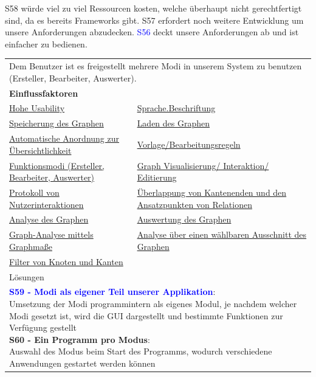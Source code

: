 \documentclass[enabledeprecatedfontcommands,fontsize=11pt,paper=a4,twoside]{scrartcl}
\newcounter{one}
\newcommand{\cb}[1]{{\textcolor{blue}{#1}}}
\begin{document}
	\begin{onehalfspace}
		S58 würde viel zu viel Ressourcen kosten, welche überhaupt nicht gerechtfertigt sind, da es bereits Frameworks gibt. S57 erfordert noch weitere Entwicklung um unsere Anforderungen abzudecken. \cb{S56} deckt unsere Anforderungen ab und ist einfacher zu bedienen.
	\end{onehalfspace}
	
	\newpage
	\begin{tabular} {|p{8cm} p{8cm}|}
		\hline
		\rowcolor{prob}\multicolumn{2}{|l|}{\parbox{16cm}{\textbf{23: Umsetzung der Funktionsmodi}}} \\  \hline\hline 
		\multicolumn{2}{|l|}{\parbox{16cm}{Dem Benutzer ist es freigestellt mehrere Modi in unserem System zu benutzen (Ersteller, Bearbeiter, Auswerter).}}\rule{0pt}{4ex}\\ [1ex] \hline
		\multicolumn{2}{|l|}{\textbf{Einflussfaktoren}}\\
		\hyperlink {g}{Hohe Usability}&
		\hyperlink {hh}{Sprache.Beschriftung} \\
		\hyperlink {v}{Speicherung des Graphen} &
		\hyperlink {w}{Laden des Graphen} \\
		\hyperlink {x}{Automatische Anordnung zur Übersichtlichkeit} &
		\hyperlink {y}{Vorlage/Bearbeitungsregeln} \\
		\hyperlink {z}{Funktionsmodi (Ersteller, Bearbeiter, Auswerter)} &
		\hyperlink {aa}{Graph Visualisierung/ Interaktion/ Editierung}\\
		\hyperlink {bb}{Protokoll von Nutzerinteraktionen} &
		\hyperlink {cc}{Überlappung von Kantenenden und den Ansatzpunkten von Relationen} \\
		\hyperlink {oo}{Analyse des Graphen} &
		\hyperlink {pp}{Auswertung des Graphen} \\
		\hyperlink {qq}{Graph-Analyse mittels Graphmaße} & 
		\hyperlink {rr}{Analyse über einen wählbaren Ausschnitt des Graphen} \\ 
		\hyperlink {ss}{Filter von Knoten und Kanten} &
		\\ \hline
		\multicolumn{2}{|l|}{Lösungen} \\
		\multicolumn{2}{|l|}{\parbox{16cm}{
				\textbf{\cb{\hypertarget{uuu}{S59 - Modi als eigener Teil unserer Applikation}}}: \\
				Umsetzung der Modi programmintern als eigenes Modul, je nachdem welcher Modi gesetzt ist, wird die GUI dargestellt und bestimmte Funktionen zur Verfügung gestellt \\
				\textbf{S60 - Ein Programm pro Modus}: \\
				Auswahl des Modus beim Start des Programms, wodurch verschiedene Anwendungen gestartet werden können
		} }\\ [7ex] \hline
	\end{tabular}\\ \\ \\
\end{document}
